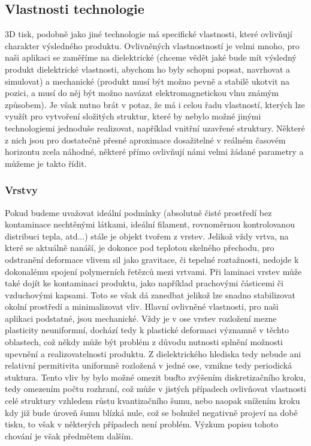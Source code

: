 \subsection{Vlastnosti technologie}
3D tisk, podobně jako jiné technologie má specifické vlastnosti, které ovlivňují charakter výsledného produktu. Ovlivněných vlastnostností je velmi mnoho, pro naši aplikaci se zaměříme na dielektrické (chceme vědět jaké bude mít výsledný produkt dielektrické vlastnosti, abychom ho byly schopni popsat, navrhovat a simulovat) a mechanické (produkt musí být možno pevně a stabilě ukotvit na pozici, a musí do něj být možno navázat elektromagnetickou vlnu známým způsobem). Je však nutno brát v potaz, že má i celou řadu vlastností, kterých lze využít pro vytvoření složitých struktur, které by nebylo možné jinými technologiemi jednoduše realizovat, například vnitřní uzavřené struktury. Některé z nich jsou pro dostatečně přesné aproximace dosažitelné v reálném časovém horizontu zcela náhodné, některé přímo ovlivňují námi velmi žádané parametry a můžeme je takto řídit.
\subsubsection{Vrstvy}
Pokud budeme uvažovat ideální podmínky (absolutně čisté prostředí bez kontaminace nechtěnými látkami, ideální filament, rovnoměrnou kontrolovanou distribuci tepla, atd...) stále je objekt tvořem z vrstev. Jelikož vždy vrtva, na které se aktuálně nanáší, je dokonce pod teplotou skelného přechodu, pro odstranění deformace vlivem sil jako gravitace, či tepelné roztažnosti, nedojde k dokonalému spojení polymerních řetězců mezi vrtvami. Při laminaci vrstev může také dojít ke kontaminaci produktu, jako například prachovými částicemi či vzduchovými kapsami. Toto se však dá zanedbat jelikož lze snadno stabilizovat okolní prostředí a minimalizovat vliv. 
Hlavní ovlivněné vlastnosti, pro naši aplikaci podstatné, jsou mechanické. Vždy je v ose vrstev rozložení mezne plasticity neuniformní, dochází tedy k plastické deformaci významně v těchto oblastech, což někdy může být problém z důvodu nutnosti splnění možnosti upevnění a realizovatelnosti produktu.
Z dielektrického hlediska tedy nebude ani relativní permitivita uniformně rozložená v jedné ose, vznikne tedy periodická stuktura. Tento vliv by bylo možné omezit buďto zvýšením diskretizačního kroku, tedy omezením počtu rozhraní, což může v jistých případech ovlivňovat vlastnosti celé struktury vzhledem růstu kvantizačního šumu, nebo naopak snížením kroku kdy již bude úroveň šumu blízká nule, což se bohužel negativně projeví na době tisku, to však v některých případech není problém. Výzkum popisu tohoto chování je však předmětem dalším.

